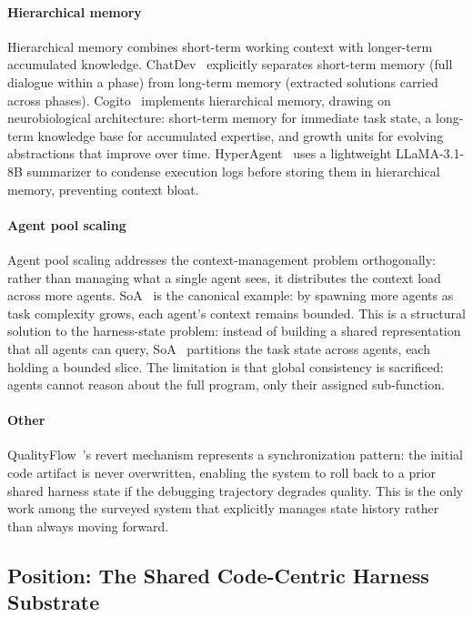 \paragraph{Hierarchical memory} Hierarchical memory combines
short-term working context with longer-term accumulated
knowledge. ChatDev~\cite{Qian2023ChatDev} explicitly separates
short-term memory (full dialogue within a phase) from long-term
memory (extracted solutions carried across phases).
Cogito~\cite{Li2025Cogito} implements hierarchical memory, drawing on
neurobiological architecture: short-term memory for immediate
task state, a long-term knowledge base for accumulated expertise,
and growth units for evolving abstractions that improve over
time. HyperAgent~\cite{Phan2024HyperAgent} uses a lightweight
LLaMA-3.1-8B summarizer to condense execution logs before storing
them in hierarchical memory, preventing context bloat.

\paragraph{Agent pool scaling} Agent pool scaling addresses the
context-management problem orthogonally: rather than managing
what a single agent sees, it distributes the context load across
more agents. SoA~\cite{Ishibashi2024SelfOrganized} is the
canonical example: by spawning more agents as task complexity
grows, each agent's context remains bounded. This is a
structural solution to the harness-state problem: instead of
building a shared representation that all agents can query,
SoA~\cite{Ishibashi2024SelfOrganized} partitions the task state
across agents, each holding a bounded slice. The limitation is
that global consistency is sacrificed: agents cannot reason about
the full program, only their assigned sub-function.

\paragraph{Other}
QualityFlow~\cite{Hu2025QualityFlow}'s revert mechanism
represents a synchronization pattern: the initial code artifact is never overwritten,
enabling the system to roll back to a prior shared harness state
if the debugging trajectory degrades quality. This is the only
work among the surveyed system that explicitly manages state history rather than always
moving forward.

\subsection{Position: The Shared Code-Centric Harness Substrate}

